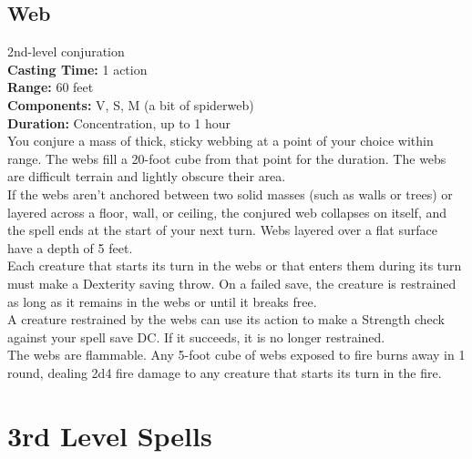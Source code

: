 \documentclass[11pt, A4paper, english]{article}
\begin{document}
		\subsection{Web}
2nd-level conjuration \\
\textbf{Casting Time:} 1 action \\
\textbf{Range:} 60 feet \\
\textbf{Components:} V, S, M (a bit of spiderweb) \\
\textbf{Duration:} Concentration, up to 1 hour \\
You conjure a mass of thick, sticky webbing at a point of your choice within range. The webs fill a 20-foot cube from that point for the duration. The webs are difficult terrain and lightly obscure their area. \\
If the webs aren't anchored between two solid masses (such as walls or trees) or layered across a floor, wall, or ceiling, the conjured web collapses on itself, and the spell ends at the start of your next turn. Webs layered over a flat surface have a depth of 5 feet. \\
Each creature that starts its turn in the webs or that enters them during its turn must make a Dexterity saving throw. On a failed save, the creature is restrained as long as it remains in the webs or until it breaks free. \\
A creature restrained by the webs can use its action to make a Strength check against your spell save DC. If it succeeds, it is no longer restrained. \\
The webs are flammable. Any 5-foot cube of webs exposed to fire burns away in 1 round, dealing 2d4 fire damage to any creature that starts its turn in the fire.



	\section{3rd Level Spells}
\end{document}
